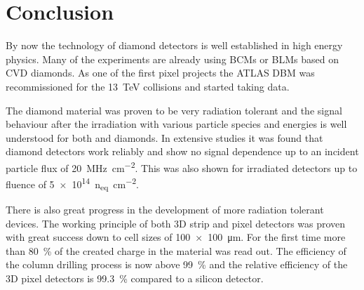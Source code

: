 \section{Conclusion}
By now the technology of diamond detectors is well established in high energy physics. Many of the experiments are already using \acp{BCM} or \acp{BLM} based on \ac{CVD} diamonds. As one of the first pixel projects the ATLAS \ac{DBM}  was recommissioned for the \SI{13}{\tera\electronvolt} collisions and started taking data.\par
The diamond material was proven to be very radiation tolerant and the signal behaviour after the irradiation with various particle species and energies is well understood for both \sccvd and \pcvd diamonds. In extensive studies it was found that \pcvd diamond detectors work reliably and show no signal dependence up to an incident particle flux of \SI{20}{\mega\hertz\per\centi\meter^2}. This was also shown for irradiated detectors up to fluence of \SI{5e14}{n_{eq}\per \centi\meter^2}.\par
There is also great progress in the development of more radiation tolerant devices. The working principle of both 3D strip and pixel detectors was proven with great success down to cell sizes of \SI{100x100}{\micro\meter}. For the first time more than \SI{80}{\%} of the created charge in the material was read out. The efficiency of the column drilling process is now above \SI{99}{\%} and the relative efficiency of the 3D pixel detectors is \SI{99.3}{\%} compared to a silicon detector.